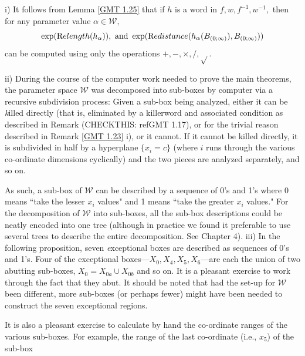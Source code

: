 \begin{remark}\label{GMT 1.26} i)  It follows from Lemma \ref{GMT 1.25} that if $h$ is a word in $f,w,f^{-1},w^{-1},$ then for any
parameter value $\alpha\in {\mathcal W},$
$$\exp({\textrm Relength}(h_\alpha)), \hbox{ and }
  \exp({\textrm Redistance}(h_\alpha(B_{(0;\infty)}), B_{(0;\infty)}))$$ can be computed using only the
operations $+, -, \times, /, \sqrt{}.$

 ii) During the course of the computer work needed to prove the main theorems, the parameter space
${\mathcal W}$ was decomposed into sub-boxes by computer via a recursive subdivision process:
Given a sub-box  being analyzed, either it can be {\textit killed directly} (that is, eliminated by a killerword and associated condition as described in
Remark (CHECKTHIS: ref{GMT 1.17}),
or for the trivial reason described in Remark \ref{GMT 1.23} i), or it cannot.  
If it cannot be killed directly, it is subdivided in half by a hyperplane
$\{x_i = c \}$ (where $i$ runs through the various co-ordinate dimensions
cyclically) and the two pieces are analyzed separately, and so on. 

As such, a sub-box of ${\mathcal W}$ can be described by a sequence of 0's and 1's where 0 means ``take the lesser $x_i$ values" and 1 means ``take the greater $x_i$ values."  
For the decomposition of ${\mathcal W}$ into sub-boxes, all the 
sub-box descriptions could be neatly encoded into one tree (although in practice we found it preferable to use several trees to describe the entire
decomposition.  See Chapter 4).
iii) In the following proposition, seven {\textit exceptional boxes} are described as sequences of 0's and 1's.  
Four of the exceptional boxes---$X_0, X_4, X_5, X_6$---are each the union of two abutting sub-boxes, $X_0 = X_{0a} \cup X_{0b}$ and so on.  It is a pleasant exercise to work through the fact that they abut.  
It should be noted that had the set-up for ${\mathcal W}$ been different, more sub-boxes (or perhaps fewer) might have been needed to construct the seven
exceptional regions. 

It is also a pleasant exercise to calculate by hand the co-ordinate ranges of the various sub-boxes.  For example, the range of the last co-ordinate (i.e., $x_5$) of the sub-box 
\eject


\end{remark}
